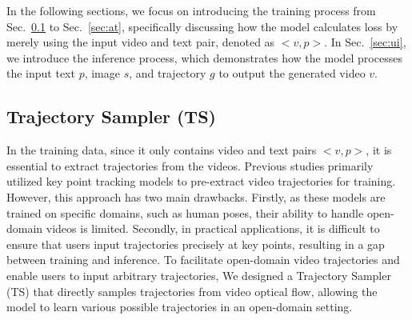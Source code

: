 \documentclass{article} %
\begin{document}
In the following sections, we focus on introducing the training process from Sec.~\ref{sec:ts} to Sec.~\ref{sec:at}, specifically discussing how the model calculates loss by merely using the input video and text pair, denoted as $<v, p>$. In Sec.~\ref{sec:ui}, we introduce the inference process, which demonstrates how the model processes the input text $p$, image $s$, and trajectory $g$ to output the generated video $v$.

  
\subsection{Trajectory Sampler (TS)}\label{sec:ts}

In the training data,  since it only contains video and text pairs $<v,p>$, it is essential to extract trajectories from the videos. Previous studies primarily utilized key point tracking models to pre-extract video trajectories for training. However, this approach has two main drawbacks. Firstly, as these models are trained on specific domains, such as human poses, their ability to handle open-domain videos is limited. Secondly, in practical applications, it is difficult to ensure that users input trajectories precisely at key points, resulting in a gap between training and inference. To facilitate open-domain video trajectories and enable users to input arbitrary trajectories, We designed a Trajectory Sampler (TS) that directly samples trajectories from video optical flow, allowing the model to learn various possible trajectories in an open-domain setting.
\end{document}
